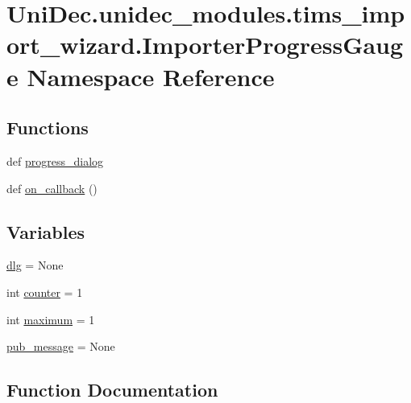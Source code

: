 \hypertarget{namespace_uni_dec_1_1unidec__modules_1_1tims__import__wizard_1_1_importer_progress_gauge}{}\section{Uni\+Dec.\+unidec\+\_\+modules.\+tims\+\_\+import\+\_\+wizard.\+Importer\+Progress\+Gauge Namespace Reference}
\label{namespace_uni_dec_1_1unidec__modules_1_1tims__import__wizard_1_1_importer_progress_gauge}
\subsection*{Functions}
\begin{DoxyCompactItemize}
\item 
def \hyperlink{namespace_uni_dec_1_1unidec__modules_1_1tims__import__wizard_1_1_importer_progress_gauge_a1d3bafcc1c5547cdff8d5facc6c10992}{progress\+\_\+dialog}
\item 
def \hyperlink{namespace_uni_dec_1_1unidec__modules_1_1tims__import__wizard_1_1_importer_progress_gauge_aaaab2621e7b03f7c8ee87ea5f26f04d4}{on\+\_\+callback} ()
\end{DoxyCompactItemize}
\subsection*{Variables}
\begin{DoxyCompactItemize}
\item 
\hyperlink{namespace_uni_dec_1_1unidec__modules_1_1tims__import__wizard_1_1_importer_progress_gauge_abb5fbd4027ad20aac4b531da75d0b800}{dlg} = None
\item 
int \hyperlink{namespace_uni_dec_1_1unidec__modules_1_1tims__import__wizard_1_1_importer_progress_gauge_aad568fd0ac9f139eb2e8030362b9509e}{counter} = 1
\item 
int \hyperlink{namespace_uni_dec_1_1unidec__modules_1_1tims__import__wizard_1_1_importer_progress_gauge_a23a76f715dfc6b567ac61d0b26c43116}{maximum} = 1
\item 
\hyperlink{namespace_uni_dec_1_1unidec__modules_1_1tims__import__wizard_1_1_importer_progress_gauge_ae77fa4fa3f1b45d7f125badf7485eecf}{pub\+\_\+message} = None
\end{DoxyCompactItemize}


\subsection{Function Documentation}
\hypertarget{namespace_uni_dec_1_1unidec__modules_1_1tims__import__wizard_1_1_importer_progress_gauge_aaaab2621e7b03f7c8ee87ea5f26f04d4}{}
